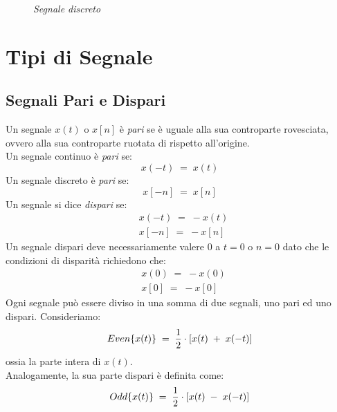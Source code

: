 \documentclass{article}
\begin{document}
		\begin{figure} [h]
			\begin{center}
			\end{center}
			\captionsetup{labelformat=empty}
			\caption{\textit{Segnale discreto}}
		\end{figure}

	\newpage

	\section{Tipi di Segnale}
		\subsection{Segnali Pari e Dispari}
			Un segnale $ x(t) $ o $ x[n] $ è \textit{pari} se è uguale alla sua controparte rovesciata, ovvero alla sua controparte ruotata di  rispetto all'origine. \\
			Un segnale continuo è \textit{pari} se:
			\[
				x(-t)\; =\; x(t)
			\]
			Un segnale discreto è \textit{pari} se:
			\[
				x[-n]\; =\; x[n]
			\]
			Un segnale si dice \textit{dispari} se:
			\[
				\begin{aligned}
					&x(-t)\; =\; -x(t) \\
					&x[-n]\; =\; -x[n]
				\end{aligned}
			\]
			Un segnale dispari deve necessariamente valere 0 a $ t=0 $ o $ n=0 $ dato che le condizioni di disparità richiedono che:
			\[
			\begin{aligned}
				&x(0)\; =\; -x(0) \\
				&x[0]\; =\; -x[0]
			\end{aligned}
			\]
			Ogni segnale può essere diviso in una somma di due segnali, uno pari ed uno dispari.
			Consideriamo:
			\[
				Even\{x(t)\}\; =\; {{1}\over{2}} \cdot [x(t)\; +\; x(-t)]
			\]
			ossia la parte intera di $ x(t) $. \\
			Analogamente, la sua parte dispari è definita come:
			\[
				Odd\{x(t)\}\; =\; {{1}\over{2}} \cdot [x(t)\; -\; x(-t)]
			\]
\end{document}
